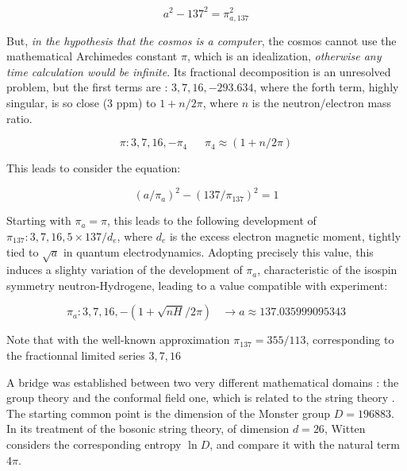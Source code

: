 \documentclass[a4paper,9pt]{article}
\begin{document}
\begin{equation}
a^2 - 137^2 = \pi_{a,137}^2
\end{equation}

 But, \textit {in the hypothesis that the cosmos is a computer}, the cosmos cannot use the mathematical Archimedes constant $\pi$, which is an idealization, \textit {otherwise any time calculation would be infinite}. Its fractional decomposition is an unresolved problem, but the first terms are : $3, 7, 16, -293.634$, where the forth term, highly singular, is so close (3 ppm) to $1 + n/2\pi$, where $n$ is the neutron/electron mass ratio.

\begin{equation}
\pi : 3, 7, 16, -\pi_4 ~~~~~~~   \pi_4 \approx (1+n/2\pi)
\end{equation}

This leads to consider the equation:

\begin{equation}
 (a/\pi_a)^2 - (137/\pi_{137})^2 = 1
\end{equation}  

Starting with $\pi_a = \pi$, this leads to the following development of $\pi_{137} : 3,7,16,5\times 137/d_e$, where $d_e$ is the excess electron magnetic moment, tightly tied to $\sqrt{a}$ in quantum electrodynamics. Adopting precisely this value, this induces a slighty variation of the development of $\pi_a$, characteristic of the isospin symmetry neutron-Hydrogene, leading to a value compatible with experiment:

\begin{equation}
\pi_a : 3, 7, 16, -(1+ \sqrt{nH}/2\pi) ~~~~ \rightarrow a \approx 137.035999095343
\end{equation}


Note that with the well-known approximation $\pi_{137} = 355/113$, corresponding to the fractionnal limited series $3,7,16$ %
  
  
  A bridge was established between two very different mathematical domains : the group theory and the conformal field one, which is related to the string theory \cite{Frenkel}. The starting common point is the dimension of the Monster group $D = 196883$. In its treatment of the bosonic string theory, of dimension $d = 26$, Witten \cite{Witten} considers the corresponding entropy $\ln{D}$, and compare it with the natural term $4\pi$. 
  
\end{document}
